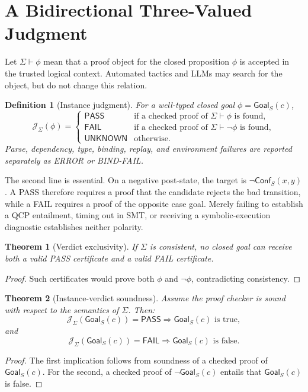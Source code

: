 \documentclass[10pt]{article}
\newtheorem{definition}{Definition}
\newtheorem{theorem}{Theorem}
\newcommand{\pass}{\textsf{PASS}}
\newcommand{\fail}{\textsf{FAIL}}
\newcommand{\unknown}{\textsf{UNKNOWN}}
\newcommand{\error}{\textsf{ERROR}}
\newcommand{\bindfail}{\textsf{BIND-FAIL}}
\newcommand{\judge}{\mathcal{J}}
\newcommand{\ctx}{\Sigma}
\newcommand{\goal}{\mathsf{Goal}}
\begin{document}
\section{A Bidirectional Three-Valued Judgment}
\label{sec:judgment}

Let $\ctx\vdash\phi$ mean that a proof object for the closed proposition
$\phi$ is accepted in the trusted logical context.  Automated tactics and LLMs
may search for the object, but do not change this relation.

\begin{definition}[Instance judgment]
For a well-typed closed goal $\phi=\goal_S(c)$,
\[
\judge_{\ctx}(\phi)=
\begin{cases}
\pass & \text{if a checked proof of }\ctx\vdash\phi\text{ is found},\\
\fail & \text{if a checked proof of }\ctx\vdash\neg\phi\text{ is found},\\
\unknown & \text{otherwise}.
\end{cases}
\]
Parse, dependency, type, binding, replay, and environment failures are reported
separately as \error{} or \bindfail.
\end{definition}

The second line is essential.  On a negative post-state, the target is
$\neg\mathsf{Conf}_S(x,y)$.  A \pass{} therefore requires a proof that
the candidate rejects the bad transition, while a \fail{} requires a proof of
the opposite case goal.  Merely failing to establish a QCP entailment, timing
out in SMT, or receiving a symbolic-execution diagnostic establishes neither
polarity.

\begin{theorem}[Verdict exclusivity]
If $\ctx$ is consistent, no closed goal can receive both a valid \pass{}
certificate and a valid \fail{} certificate.
\end{theorem}
\begin{proof}
Such certificates would prove both $\phi$ and $\neg\phi$, contradicting
consistency.
\end{proof}

\begin{theorem}[Instance-verdict soundness]
Assume the proof checker is sound with respect to the semantics of $\ctx$.
Then:
\[
\judge_{\ctx}(\goal_S(c))=\pass
\Longrightarrow \goal_S(c)\text{ is true},
\]
and
\[
\judge_{\ctx}(\goal_S(c))=\fail
\Longrightarrow \goal_S(c)\text{ is false}.
\]
\end{theorem}
\begin{proof}
The first implication follows from soundness of a checked proof of $\goal_S(c)$.
For the second, a checked proof of $\neg\goal_S(c)$ entails that
$\goal_S(c)$ is false.
\end{proof}
\end{document}
